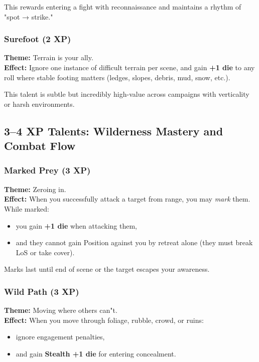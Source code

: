 \documentclass[11pt]{book}
\begin{document}
This rewards entering a fight with reconnaissance
and maintains a rhythm of "spot → strike."

\subsubsection{Surefoot (2 XP)}
\textbf{Theme:} Terrain is your ally.\\
\textbf{Effect:} Ignore one instance of difficult terrain per scene,
and gain \textbf{+1 die} to any roll where stable footing matters
(ledges, slopes, debris, mud, snow, etc.).

This talent is subtle but incredibly high-value across campaigns
with verticality or harsh environments.

\subsection{3--4 XP Talents: Wilderness Mastery and Combat Flow}

\subsubsection{Marked Prey (3 XP)}
\textbf{Theme:} Zeroing in.\\
\textbf{Effect:} When you successfully attack a target from range,
you may \emph{mark} them. While marked:
\begin{itemize}
  \item you gain \textbf{+1 die} when attacking them,
  \item and they cannot gain Position against you by retreat alone
        (they must break LoS or take cover).
\end{itemize}

Marks last until end of scene or the target escapes your awareness.

\subsubsection{Wild Path (3 XP)}
\textbf{Theme:} Moving where others can"t.\\
\textbf{Effect:} When you move through foliage, rubble, crowd, or ruins:
\begin{itemize}
  \item ignore engagement penalties,
  \item and gain \textbf{Stealth +1 die} for entering concealment.
\end{itemize}
\end{document}

